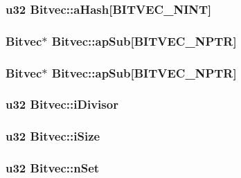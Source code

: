 \subsubsection{\setlength{\rightskip}{0pt plus 5cm}\bf{u32} \bf{Bitvec::a\-Hash}[BITVEC\_\-NINT]}\label{structBitvec_5045c9bbb2b3eabd44d3366a2975b6e4}


\subsubsection{\setlength{\rightskip}{0pt plus 5cm}\bf{Bitvec}$\ast$ \bf{Bitvec::ap\-Sub}[BITVEC\_\-NPTR]}\label{structBitvec_dfdf149412fff9c253c27470c6c8c128}


\subsubsection{\setlength{\rightskip}{0pt plus 5cm}\bf{Bitvec}$\ast$ \bf{Bitvec::ap\-Sub}[BITVEC\_\-NPTR]}\label{structBitvec_dfdf149412fff9c253c27470c6c8c128}


\subsubsection{\setlength{\rightskip}{0pt plus 5cm}\bf{u32} \bf{Bitvec::i\-Divisor}}\label{structBitvec_f79f302ea9985402da4f5cbfc99f1837}


\subsubsection{\setlength{\rightskip}{0pt plus 5cm}\bf{u32} \bf{Bitvec::i\-Size}}\label{structBitvec_ed67fc2664a3de1f91d10cd48c71cd4f}


\subsubsection{\setlength{\rightskip}{0pt plus 5cm}\bf{u32} \bf{Bitvec::n\-Set}}\label{structBitvec_d8882ff07536b559c3f8340b8fb6cc93}


